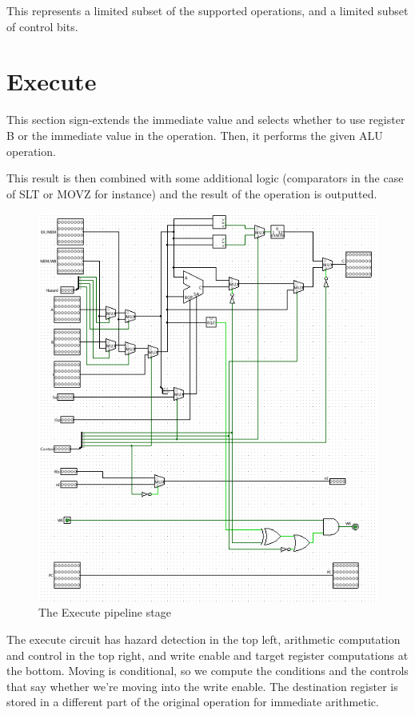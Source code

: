 \documentclass{article}
\begin{document}
This represents a limited subset of the supported operations, and a limited subset of control bits. 

\section*{Execute}
This section sign-extends the immediate value and selects whether to use register B or the immediate value in the operation.  Then, it performs the given ALU operation.

This result is then combined with some additional logic (comparators in the case of SLT  or MOVZ for instance) and the result of the operation is outputted.

\begin{figure}[h]
	\includegraphics[width = \textwidth]{execute}
	\caption{The Execute pipeline stage}
\end{figure}

The execute circuit has hazard detection in the top left, arithmetic computation and control in the top right, and write enable and target register computations at the bottom. Moving is conditional, so we compute the conditions and the controls that say whether we're moving into the write enable. The destination register is stored in a different part of the original operation for immediate arithmetic. 
\end{document}
